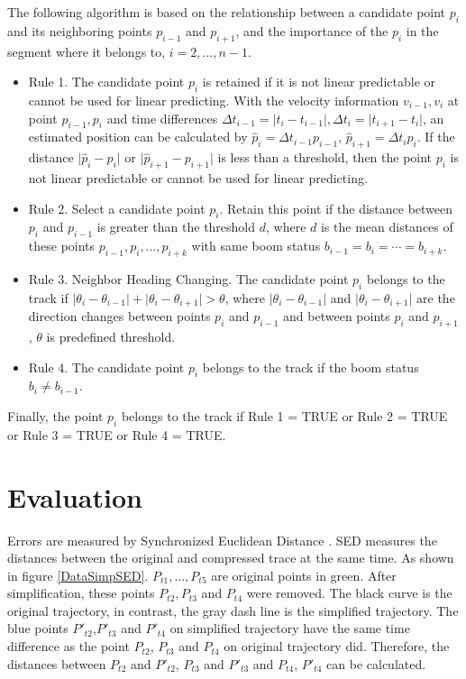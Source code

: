 The following algorithm is based on the relationship between a candidate point $p_i$ and its neighboring points $p_{i-1}$ and $p_{i+1}$, and the importance of the $p_i$ in the segment where it belongs to, $i=2,\ldots,n-1$. 

\begin{itemize}
\item Rule 1. The candidate point $p_i$ is retained if it is not linear predictable or cannot be used for linear predicting. With the velocity information $v_{i-1}, v_i$ at point $p_{i-1}, p_i$ and time differences $\Delta t_{i-1} = \lvert t_{i}-t_{i-1} \rvert,\Delta t_{i} = \lvert t_{i+1}-t_{i}\rvert$, an estimated position can be calculated by $\hat{p}_i=\Delta t_{i-1} p_{i-1}$, $\hat{p}_{i+1}=\Delta t_{i} p_{i}$. If the distance $\lvert \hat{p}_i-p_i\rvert$ or $\lvert \hat{p}_{i+1}-p_{i+1}\rvert$ is less than a threshold, then the point $p_i$ is not linear predictable or cannot be used for linear predicting.

\item Rule 2. Select a candidate point $p_i$. Retain this point if the distance between $p_i$ and $p_{i-1}$ is greater than the threshold $d$, where $d$ is the mean distances of these points $p_{i-1}, p_i, \ldots, p_{i+k}$ with same boom status $b_{i-1}=b_i=\cdots=b_{i+k}$. 

\item Rule 3. Neighbor Heading Changing. The candidate point $p_i$ belongs to the track if $\lvert \theta_i-\theta_{i-1}\rvert  + \lvert \theta_i-\theta_{i+1}\rvert >\theta$, where $\lvert \theta_i-\theta_{i-1}\rvert$ and $ \lvert \theta_i-\theta_{i+1}\rvert $ are the direction changes between points $p_i$ and $p_{i-1}$ and between points $p_i$ and $p_{i+1}$, $\theta$ is predefined threshold.

\item Rule 4. The candidate point $p_i$ belongs to the track if the boom status $b_i\neq b_{i-1}$.
\end{itemize}

Finally, the point $p_i$ belongs to the track if Rule 1 = TRUE or Rule 2 = TRUE or Rule 3 = TRUE or Rule 4 = TRUE.


\section{Evaluation}

Errors are measured by Synchronized Euclidean Distance \cite{lawson2011compression}. SED measures the distances between the original and compressed trace at the same time. As shown in figure \ref{DataSimpSED}. $P_{t1}, \ldots ,P_{t5}$ are original points in green. After simplification, these points $P_{t2}, P_{t3}$ and $P_{t4}$ were removed. The black curve is the original trajectory, in contrast, the gray dash line is the simplified trajectory. The blue points $P'_{t2}$,$P'_{t3}$ and $P'_{t4}$ on simplified trajectory have the same time difference as the point $P_{t2}$, $P_{t3}$ and $P_{t4}$ on original trajectory did. Therefore, the distances between $P_{t2}$ and $P'_{t2}$, $P_{t3}$ and $P'_{t3}$ and $P_{t4}$, $P'_{t4}$ can be calculated.


